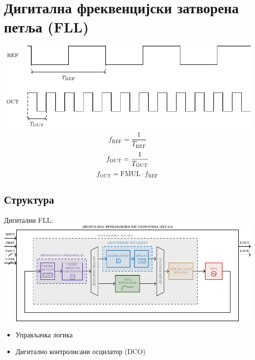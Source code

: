 \documentclass[aspectratio=169]{beamer}
\def \FLL  {FLL} %
\begin{document}
\section{Дигитална фреквенцијски затворена петља (\FLL)}
\begin{frame}{\secname}
    \small
    \centering
    \hspace{-0.8cm}
    \includegraphics[scale=0.8]{slike/prezentacija/fll_fref_fout.pdf}
    \vspace{-0.2cm}
    \begin{equation}
        f_\text{REF} = \frac{1}{T_\text{REF}}
    \end{equation}
    \begin{equation}
        f_\text{OUT} = \frac{1}{T_\text{OUT}}
        \vspace{0.3cm}
    \end{equation}
    \begin{equation}
	f_\text{OUT} = \text{FMUL} \cdot f_\text{REF}
    \end{equation}
\end{frame}

\subsection{Структура}
\begin{frame}{Дигитални \FLL: \subsecname}
	\centering
	\includegraphics[scale=0.85]{slike/prezentacija/FLL.pdf}
	\medskip
	\begin{itemize}
		\item Управљачка логика
		\item Дигитално контролисани осцилатор (DCO)
	\end{itemize}
\end{frame}
\end{document}
